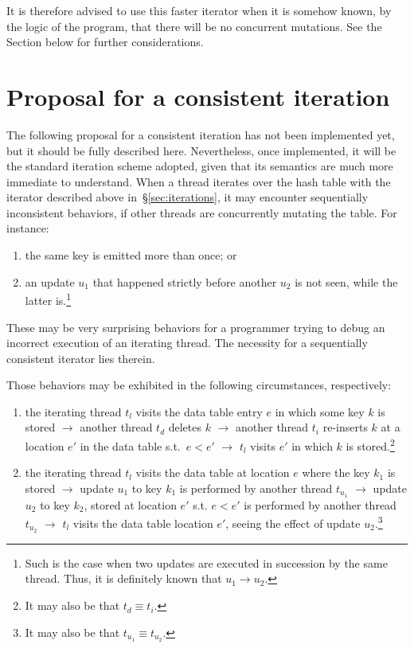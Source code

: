 It is therefore advised to use this faster iterator when it is somehow known, by the logic of the program, that there will be no concurrent mutations.
See the Section below for further considerations.


\section{Proposal for a consistent iteration}\label{sec:consistent-iteration}

The following proposal for a consistent iteration has not been implemented yet, but it should be fully described here.
Nevertheless, once implemented, it will be the standard iteration scheme adopted, given that its semantics are much more immediate to understand.
When a thread iterates over the hash table with the iterator described above in~\S\ref{sec:iterations}, it may encounter sequentially inconsistent behaviors, if other threads are concurrently mutating the table.
For instance:
\begin{enumerate}
	\item the same key is emitted more than once; or
	\item an update $u_1$ that happened strictly before another $u_2$ is not seen, while the latter is.\footnote{%
		Such is the case when two updates are executed in succession by the same thread.
		Thus, it is definitely known that $u_1 \rightarrow u_2$.
	}
\end{enumerate}

These may be very surprising behaviors for a programmer trying to debug an incorrect execution of an iterating thread.
The necessity for a sequentially consistent iterator lies therein.

Those behaviors may be exhibited in the following circumstances, respectively:
\begin{enumerate}
	\item the iterating thread $t_l$ visits the data table entry $e$ in which some key $k$ is stored $\rightarrow$ another thread $t_d$ deletes $k$ $\rightarrow$ another thread $t_i$ re-inserts $k$ at a location $e'$ in the data table s.t.\ $e < e'$ $\rightarrow$ $t_l$ visits $e'$ in which $k$ is stored.\footnote{%
		It may also be that $t_d \equiv t_i$.
	}
	\item the iterating thread $t_l$ visits the data table at location $e$ where the key $k_1$ is stored $\rightarrow$ update $u_1$ to key $k_1$ is performed by another thread $t_{u_1}$ $\rightarrow$ update $u_2$ to key $k_2$, stored at location $e'$ s.t. $e < e'$ is performed by another thread $t_{u_2}$ $\rightarrow$ $t_l$ visits the data table location $e'$, seeing the effect of update $u_2$.\footnote{%
		It may also be that $t_{u_1} \equiv t_{u_2}$.
	}
\end{enumerate}

